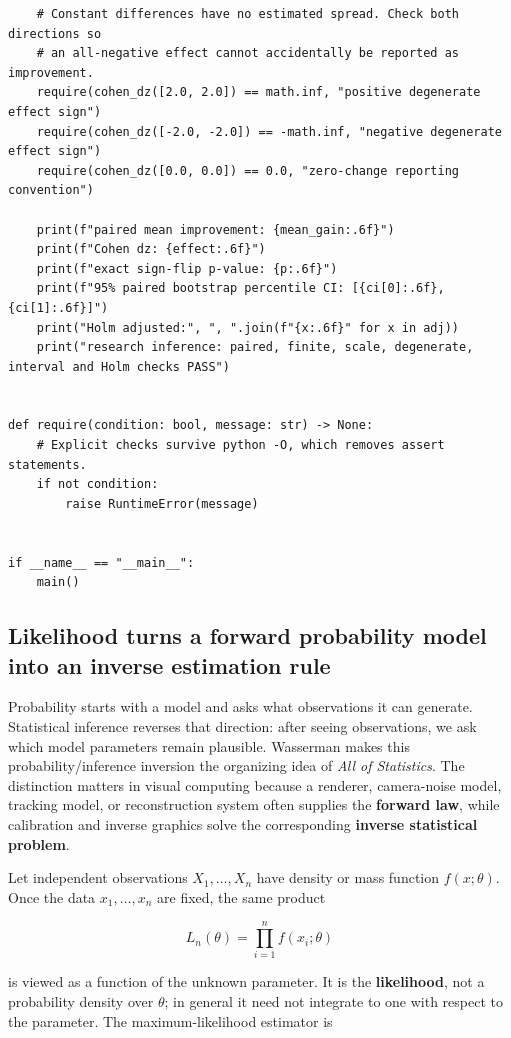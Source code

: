 \begin{verbatim}
    # Constant differences have no estimated spread. Check both directions so
    # an all-negative effect cannot accidentally be reported as improvement.
    require(cohen_dz([2.0, 2.0]) == math.inf, "positive degenerate effect sign")
    require(cohen_dz([-2.0, -2.0]) == -math.inf, "negative degenerate effect sign")
    require(cohen_dz([0.0, 0.0]) == 0.0, "zero-change reporting convention")

    print(f"paired mean improvement: {mean_gain:.6f}")
    print(f"Cohen dz: {effect:.6f}")
    print(f"exact sign-flip p-value: {p:.6f}")
    print(f"95% paired bootstrap percentile CI: [{ci[0]:.6f}, {ci[1]:.6f}]")
    print("Holm adjusted:", ", ".join(f"{x:.6f}" for x in adj))
    print("research inference: paired, finite, scale, degenerate, interval and Holm checks PASS")


def require(condition: bool, message: str) -> None:
    # Explicit checks survive python -O, which removes assert statements.
    if not condition:
        raise RuntimeError(message)


if __name__ == "__main__":
    main()
\end{verbatim}

\subsection{Likelihood turns a forward probability model into an inverse estimation rule}\label{02-foundations-ii-ch030-likelihood-turns-a-forward-probability-model-into-an-inverse-estimation-rule}

Probability starts with a model and asks what observations it can generate. Statistical inference reverses that direction: after seeing observations, we ask which model parameters remain plausible. Wasserman makes this probability/inference inversion the organizing idea of \emph{All of Statistics}. The distinction matters in visual computing because a renderer, camera-noise model, tracking model, or reconstruction system often supplies the \textbf{forward law}, while calibration and inverse graphics solve the corresponding \textbf{inverse statistical problem}.

Let independent observations \(X_1,\ldots,X_n\) have density or mass function \(f(x;\theta)\). Once the data \(x_1,\ldots,x_n\) are fixed, the same product

\[
L_n(\theta)=\prod_{i=1}^{n} f(x_i;\theta)
\]

is viewed as a function of the unknown parameter. It is the \textbf{likelihood}, not a probability density over \(\theta\); in general it need not integrate to one with respect to the parameter. The maximum-likelihood estimator is


